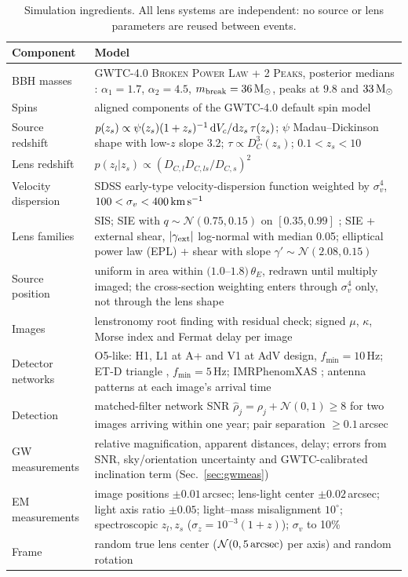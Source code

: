 \begin{table}
\centering\papertablestyle
\caption{Simulation ingredients. All lens systems are independent: no source or lens parameters are reused between events.}
\label{tab:simulation}
\begin{tabularx}{\linewidth}{@{}p{.18\linewidth}L@{}}
\toprule
Component & Model \\
\midrule
BBH masses & GWTC-4.0 \textsc{Broken Power Law + 2 Peaks}, posterior medians \citep{lvk2025gwtc4pop}: $\alpha_1=1.7$, $\alpha_2=4.5$, $m_{\rm break}=36\,{\rm M_\odot}$, peaks at $9.8$ and $33\,{\rm M_\odot}$ \\
Spins & aligned components of the GWTC-4.0 default spin model \\
Source redshift & $p(z_s)\propto \psi(z_s)(1+z_s)^{-1}\,{\rm d}V_c/{\rm d}z_s\,\tau(z_s)$; $\psi$ Madau--Dickinson shape \citep{madau2014cosmic} with low-$z$ slope 3.2; $\tau\propto D_C^3(z_s)$; $0.1<z_s<10$ \\
Lens redshift & $p(z_l|z_s)\propto (D_{C,l}D_{C,ls}/D_{C,s})^2$ \citep{turner1984statistics} \\
Velocity dispersion & SDSS early-type velocity-dispersion function \citep{choi2007vdf} weighted by $\sigma_v^4$, $100<\sigma_v<400\,{\rm km\,s^{-1}}$ \\
Lens families & SIS; SIE with $q\sim\mathcal N(0.75,0.15)$ on $[0.35,0.99]$ \citep{bolton2008slacs}; SIE + external shear, $|\gamma_{\rm ext}|$ log-normal with median 0.05; elliptical power law (EPL) + shear with slope $\gamma'\sim\mathcal N(2.08,0.15)$ \citep{auger2010slacs,tessore2015epl} \\
Source position & uniform in area within $(1.0$--$1.8)\,\theta_E$, redrawn until multiply imaged; the cross-section weighting enters through $\sigma_v^4$ only, not through the lens shape \\
Images & lenstronomy \citep{birrer2018lenstronomy,birrer2021lenstronomy} root finding with residual check; signed $\mu$, $\kappa$, Morse index and Fermat delay per image \\
Detector networks & O5-like: H1, L1 at A+ and V1 at AdV design, $f_{\min}=10$\,Hz; ET-D triangle \citep{hild2011etd}, $f_{\min}=5$\,Hz; IMRPhenomXAS \citep{pratten2020xas}; antenna patterns at each image's arrival time \\
Detection & matched-filter network SNR $\hat\rho_j=\rho_j+\mathcal N(0,1)\ge8$ for two images arriving within one year; pair separation $\ge0.1$\,arcsec \\
GW measurements & relative magnification, apparent distances, delay; errors from SNR, sky/orientation uncertainty and GWTC-calibrated inclination term (Sec.~\ref{sec:gwmeas}) \\
EM measurements & image positions $\pm0.01$\,arcsec; lens-light center $\pm0.02$\,arcsec; light axis ratio $\pm0.05$; light--mass misalignment $10^\circ$; spectroscopic $z_l,z_s$ ($\sigma_z=10^{-3}(1+z)$); $\sigma_v$ to 10\% \\
Frame & random true lens center ($\mathcal N(0,5\,{\rm arcsec})$ per axis) and random rotation \\
\bottomrule
\end{tabularx}
\end{table}

